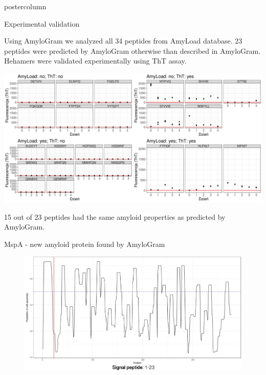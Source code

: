 \documentclass[final]{beamer}\usepackage[]{graphicx}\usepackage[]{color}
\makeatletter
\def\maxwidth{ %
  \ifdim\Gin@nat@width>\linewidth
    \linewidth
  \else
    \Gin@nat@width
  \fi
}
\newenvironment{knitrout}{}{} %
\makeatother
\begin{document}
\begin{frame}
\begin{columns}
\begin{column}{.48\textwidth}
\begin{beamercolorbox}[center,wd=\textwidth]{postercolumn}
\begin{minipage}[T]{.95\textwidth}
{\begin{block}{Experimental validation}

Using AmyloGram we analyzed all 34 peptides from AmyLoad database. 23 peptides were predicted by AmyloGram otherwise than described in AmyloGram. Hehamers were validated experimentally using ThT assay.

\begin{knitrout}
\color{fgcolor}

{\centering \includegraphics[width=\maxwidth]{figure/unnamed-chunk-2-1} 

}



\end{knitrout}

15 out of 23 peptides had the same amyloid properties as predicted by AmyloGram.

\end{block}
\vfill


\begin{block}{MspA - new amyloid protein found by AmyloGram}

\begin{figure} 
\includegraphics[width=0.9\columnwidth]{static_figure/mspa.png}
\end{figure}


\end{block}}
\end{minipage}
\end{beamercolorbox}
\end{column}
\end{columns}
\end{frame}
\end{document}
